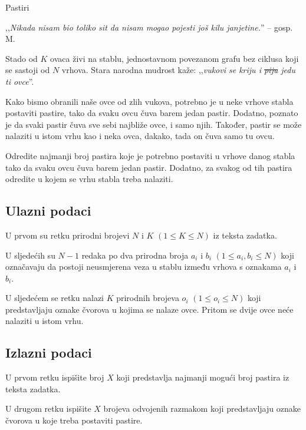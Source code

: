 \begin{statement}[
  problempoints=100,
  timelimit=1 sekunda,
  memorylimit=512 MiB,
]{Pastiri}

,,\textit{Nikada nisam bio toliko sit da nisam mogao pojesti još kilu janjetine.}''
  -- gosp. M.

Stado od $K$ ovaca živi na stablu, jednostavnom povezanom grafu bez ciklusa
koji se sastoji od $N$ vrhova. Stara narodna mudrost kaže: ,,\textit{vukovi
se kriju i \sout{piju} jedu ti ovce}''.

Kako bismo obranili naše ovce od zlih
vukova, potrebno je u neke vrhove stabla postaviti pastire, tako da svaku
ovcu čuva barem jedan pastir. Dodatno, poznato je da svaki pastir čuva sve
sebi najbliže ovce, i samo njih. Također, pastir se može nalaziti u istom vrhu
kao i neka ovca, dakako, tada on čuva samo tu ovcu.

Odredite najmanji broj pastira koje je potrebno postaviti u vrhove danog
stabla tako da svaku ovcu čuva barem jedan pastir. Dodatno, za svakog od
tih pastira odredite u kojem se vrhu stabla treba nalaziti.

\subsection*{Ulazni podaci}
U prvom su retku prirodni brojevi $N$ i $K$ $(1 \le K \le N)$ iz teksta zadatka.

U sljedećih su $N-1$ redaka po dva prirodna broja $a_i$ i $b_i$ $(1 \le a_i, b_i \le N)$ koji
označavaju da postoji neusmjerena veza u stablu između vrhova s oznakama $a_i$ i $b_i$.

U sljedećem se retku nalazi $K$ prirodnih brojeva $o_i$ $(1 \le o_i \le N)$ koji
predstavljaju oznake čvorova u kojima se nalaze ovce. Pritom se dvije ovce
neće nalaziti u istom vrhu.

\subsection*{Izlazni podaci}
U prvom retku ispišite broj $X$ koji predstavlja najmanji mogući broj pastira
iz teksta zadatka.

U drugom retku ispišite $X$ brojeva odvojenih razmakom koji predstavljaju oznake
čvorova u koje treba postaviti pastire.


\end{statement}
